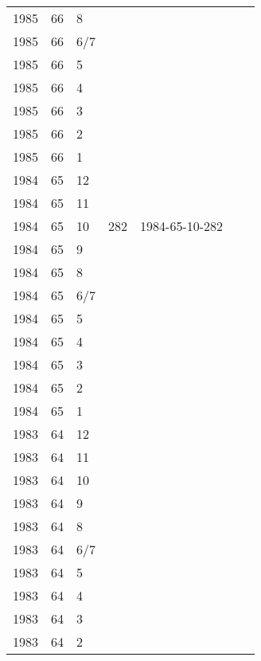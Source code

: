 \begin{longtable}{ |l|l|l|l|p{2.7cm}|l|p{2cm}| }
 1985 & 66 &     8 &         &                &  & \\
 1985 & 66 &   6/7 &         &                &  & \\
 1985 & 66 &     5 &         &                &  & \\
 1985 & 66 &     4 &         &                &  & \\
 1985 & 66 &     3 &         &                &  & \\
 1985 & 66 &     2 &         &                &  & \\
 1985 & 66 &     1 &         &                &  & \\
 1984 & 65 &    12 &         &                &  & \\
 1984 & 65 &    11 &         &                &  & \\
 1984 & 65 &    10 &     282 & 1984-65-10-282 &  & \\
 1984 & 65 &     9 &         &                &  & \\
 1984 & 65 &     8 &         &                &  & \\
 1984 & 65 &   6/7 &         &                &  & \\
 1984 & 65 &     5 &         &                &  & \\
 1984 & 65 &     4 &         &                &  & \\
 1984 & 65 &     3 &         &                &  & \\
 1984 & 65 &     2 &         &                &  & \\
 1984 & 65 &     1 &         &                &  & \\
 1983 & 64 &    12 &         &                &  & \\
 1983 & 64 &    11 &         &                &  & \\
 1983 & 64 &    10 &         &                &  & \\
 1983 & 64 &     9 &         &                &  & \\
 1983 & 64 &     8 &         &                &  & \\
 1983 & 64 &   6/7 &         &                &  & \\
 1983 & 64 &     5 &         &                &  & \\
 1983 & 64 &     4 &         &                &  & \\
 1983 & 64 &     3 &         &                &  & \\
 1983 & 64 &     2 &         &                &  & \\

\end{longtable}
